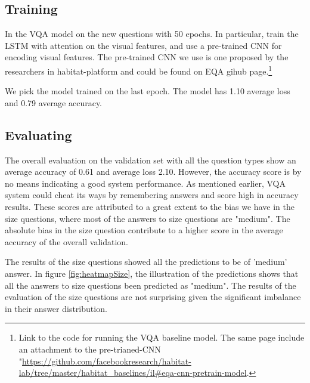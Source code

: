 



\subsection{Training}

In the VQA model on the new questions with 50 epochs. In particular, train the LSTM with attention on the visual features, and use a pre-trained CNN for encoding visual features. The pre-trained CNN we use is one proposed by the researchers in habitat-platform and could be found on EQA gihub page.\footnote{ Link to the code for running the VQA baseline model. The same page include an attachment to the pre-trianed-CNN "\url{https://github.com/facebookresearch/habitat-lab/tree/master/habitat_baselines/il\#eqa-cnn-pretrain-model}.} 

We pick the model trained on the last epoch. The model has 1.10 average loss and  0.79 average accuracy. %


\subsection{Evaluating}


The overall evaluation on the validation set with all the question types show an average accuracy of 0.61 and average loss 2.10. However, the accuracy score is by no means indicating a good system performance. As mentioned earlier, VQA system could cheat its ways by remembering answers and score high in accuracy results. These scores are attributed to a great extent to the bias we have in the size questions, where most of the answers to size questions are "medium". The absolute bias in the size question contribute to a higher score in the average accuracy of the overall validation. 


The results of the size questions showed all the predictions to be of 'medium' answer. In figure \ref{fig:heatmapSize}, the illustration of the predictions shows that all the answers to size questions been predicted as "medium". The results of the evaluation of the size questions are not surprising given the significant imbalance in their answer distribution. 


